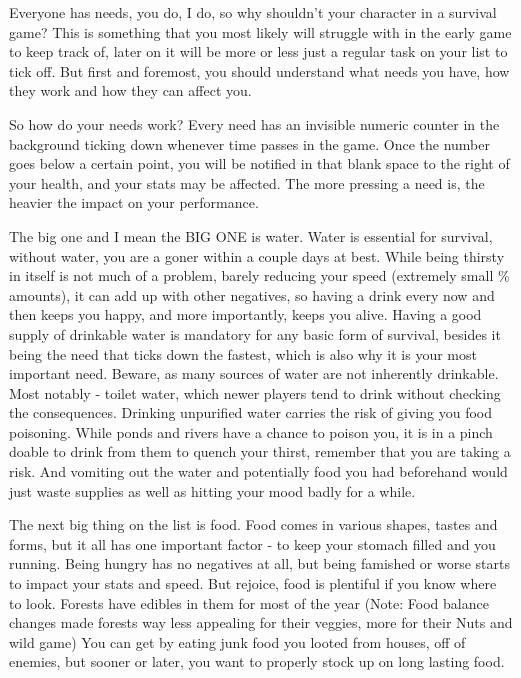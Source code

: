 Everyone has needs, you do, I do, so why shouldn't your character in a survival game? This is something that you most likely will struggle with in the early game to keep track of, later on it will be more or less just a regular task on your list to tick off. But first and foremost, you should understand what needs you have, how they work and how they can affect you.

So how do your needs work? Every need has an invisible numeric counter in the background ticking down whenever time passes in the game. Once the number goes below a certain point, you will be notified in that blank space to the right of your health, and your stats may be affected. The more pressing a need is, the heavier the impact on your performance.

The big one and I mean the BIG ONE is water. Water is essential for survival, without water, you are a goner within a couple days at best. While being thirsty in itself is not much of a problem, barely reducing your speed (extremely small \% amounts), it can add up with other negatives, so having a drink every now and then keeps you happy, and more importantly, keeps you alive. Having a good supply of drinkable water is mandatory for any basic form of survival, besides it being the need that ticks down the fastest, which is also why it is your most important need. Beware, as many sources of water are not inherently drinkable. Most notably - toilet water, which newer players tend to drink without checking the consequences. Drinking unpurified water carries the risk of giving you food poisoning. While ponds and rivers have a chance to poison you, it is in a pinch doable to drink from them to quench your thirst, remember that you are taking a risk. And vomiting out the water and potentially food you had beforehand would just waste supplies as well as hitting your mood badly for a while.

The next big thing on the list is food. Food comes in various shapes, tastes and forms, but it all has one important factor - to keep your stomach filled and you running. Being hungry has no negatives at all, but being famished or worse starts to impact your stats and speed. But rejoice, food is plentiful if you know where to look. Forests have edibles in them for most of the year (Note: Food balance changes made forests way less appealing for their veggies, more for their Nuts and wild game) You can get by eating junk food you looted from houses, off of enemies, but sooner or later, you want to properly stock up on long lasting food.

